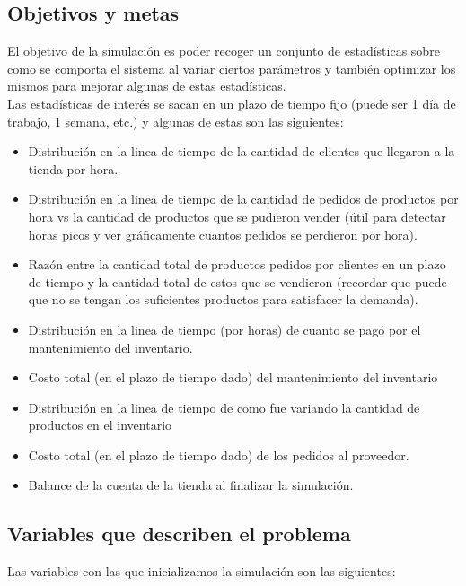 \documentclass{article}
\begin{document}
\subsection{Objetivos y metas}

El objetivo de la simulación es poder recoger un conjunto de estadísticas sobre como se comporta el sistema
al variar ciertos parámetros y también optimizar los mismos para mejorar algunas de estas estadísticas.\\
Las estadísticas de interés se sacan en un plazo de tiempo fijo (puede ser 1 día de trabajo, 1 semana, etc.) y algunas de estas son las siguientes:
\begin{itemize}
    \item Distribución en la linea de tiempo de la cantidad de clientes que llegaron a la tienda por hora.
    \item Distribución en la linea de tiempo de la cantidad de pedidos de productos por hora vs la cantidad de productos que se pudieron vender (útil para detectar horas picos y ver gráficamente cuantos pedidos se perdieron por hora).
    \item Razón entre la cantidad total de productos pedidos por clientes en un plazo de tiempo y la cantidad total de estos que se vendieron (recordar que puede que no se tengan los suficientes productos para satisfacer la demanda).
    \item Distribución en la linea de tiempo (por horas) de cuanto se pagó por el mantenimiento del inventario.
    \item Costo total (en el plazo de tiempo dado) del mantenimiento del inventario
    \item Distribución en la linea de tiempo de como fue variando la cantidad de productos en el inventario
    \item Costo total (en el plazo de tiempo dado) de los pedidos al proveedor.
    \item Balance de la cuenta de la tienda al finalizar la simulación.
\end{itemize}

\subsection{Variables que describen el problema}

Las variables con las que inicializamos la simulación son las siguientes:
\end{document}
